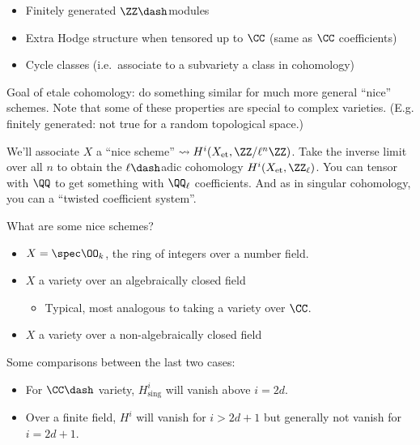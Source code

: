\begin{itemize}
\tightlist
\item
  Finitely generated \(\ZZ\dash\)modules
\item
  Extra Hodge structure when tensored up to \(\CC\) (same as \(\CC\)
  coefficients)
\item
  Cycle classes (i.e.~associate to a subvariety a class in cohomology)
\end{itemize}

Goal of etale cohomology: do something similar for much more general
``nice'' schemes. Note that some of these properties are special to
complex varieties. (E.g. finitely generated: not true for a random
topological space.)

We'll associate \(X\) a ``nice scheme''
\(\rightsquigarrow H^i(X_{\text{et}}, \ZZ/\ell^n\ZZ)\). Take the inverse
limit over all \(n\) to obtain the \(\ell\dash\)adic cohomology
\(H^i(X_{\text{et}}, \ZZ_\ell)\). You can tensor with \(\QQ\) to get
something with \(\QQ_\ell\) coefficients. And as in singular cohomology,
you can a ``twisted coefficient system''.

\begin{example}[?]

What are some nice schemes?

\begin{itemize}
\tightlist
\item
  \(X = \spec \OO_k\), the ring of integers over a number field.
\item
  \(X\) a variety over an algebraically closed field

  \begin{itemize}
  \tightlist
  \item
    Typical, most analogous to taking a variety over \(\CC\).
  \end{itemize}
\item
  \(X\) a variety over a non-algebraically closed field
\end{itemize}

\end{example}

Some comparisons between the last two cases:

\begin{itemize}
\tightlist
\item
  For \(\CC\dash\) variety, \(H^i_{\text{sing}}\) will vanish above
  \(i=2d\).
\item
  Over a finite field, \(H^i\) will vanish for \(i>2d+1\) but generally
  not vanish for \(i=2d+1\).
\end{itemize}

